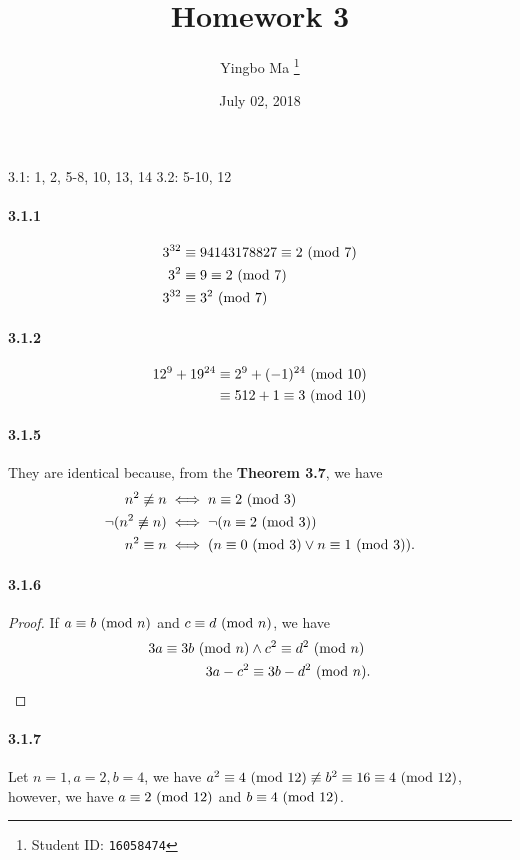 \documentclass[8pt,twocolumn]{article}
\author{Yingbo Ma \thanks{Student ID: \tt{16058474}}}
\title{\vspace{-1.cm}Homework 3}
\date{July 02, 2018}
\begin{document}
\maketitle

3.1: 1, 2, 5-8, 10, 13, 14
3.2: 5-10, 12

\paragraph{3.1.1}
  \begin{align*}
    3^{32} &\equiv 94143178827 \equiv 2 \ (\mathrm{mod}\ 7) \\
    3^2 &\equiv 9 \equiv 2 \ (\mathrm{mod}\ 7) \\
    3^{32} &\equiv 3^2 \ (\mathrm{mod}\ 7)
  \end{align*}

\paragraph{3.1.2}
  \begin{align*}
    12^{9} + 19^{24} &\equiv 2^9 + (-1)^{24} \ (\mathrm{mod}\ 10) \\
    &\equiv 512 + 1 \equiv 3 \ (\mathrm{mod}\ 10)
  \end{align*}

\paragraph{3.1.5}
They are identical because, from the \textbf{Theorem 3.7}, we have
  \begin{align*}
    n^2 \not\equiv n &\iff n\equiv 2\ (\mathrm{mod}\ 3) \\
    \neg (n^2 \not\equiv n ) &\iff \neg (n\equiv 2\ (\mathrm{mod}\ 3)) \\
    n^2 \equiv n &\iff ( n\equiv 0\ (\mathrm{mod}\ 3) \lor n\equiv 1\ (\mathrm{mod}\ 3) ).
  \end{align*}

\paragraph{3.1.6}
\begin{proof}
  If $a\equiv b\ (\mathrm{mod}\ n)$ and $c\equiv d\ (\mathrm{mod}\ n)$, we have
  \begin{align*}
    3a \equiv 3b \ (\mathrm{mod}\ n) &\land c^2 \equiv d^2 \ (\mathrm{mod}\ n) \\
    3a-c^2 &\equiv 3b - d^2 \ (\mathrm{mod}\ n).
  \end{align*}
\end{proof}

\paragraph{3.1.7}
Let $n=1, a=2, b=4$, we have $a^2 \equiv 4 \ (\mathrm{mod}\ 12) \not\equiv b^2 \equiv 16 \equiv 4 \ (\mathrm{mod}\ 12)$,
however, we have $a\equiv 2 \ (\mathrm{mod}\ 12)$ and $b\equiv 4\ (\mathrm{mod}\ 12)$.
\end{document}
